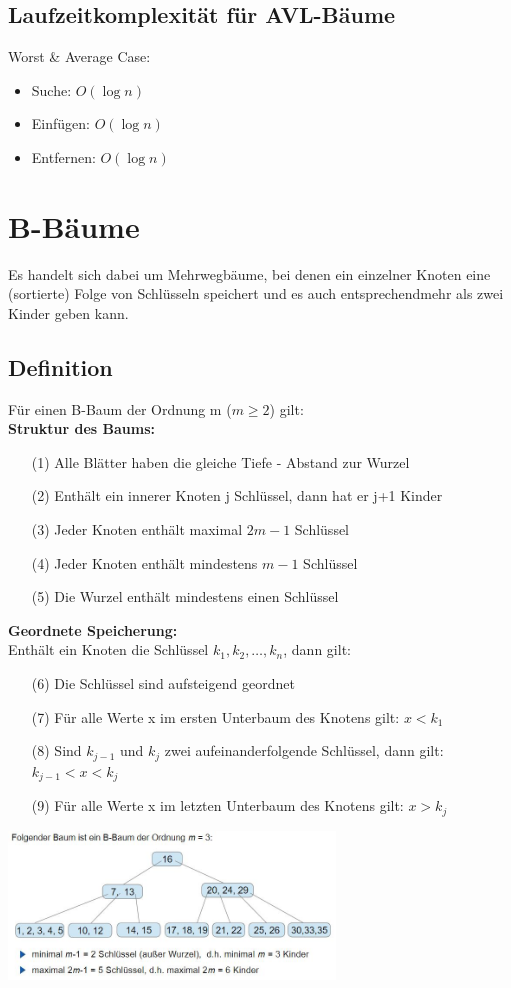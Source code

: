 \documentclass{scrreprt}
\begin{document}
\subsection{Laufzeitkomplexität für AVL-Bäume}
Worst \& Average Case:
\begin{itemize}
  \item Suche: $O(\log n)$
  \item Einfügen: $O(\log n)$
  \item Entfernen: $O(\log n)$
\end{itemize}
\section{B-Bäume}
Es handelt sich dabei um Mehrwegbäume, bei denen ein einzelner Knoten eine (sortierte) Folge von Schlüsseln
speichert und es auch entsprechendmehr als zwei Kinder geben kann.
\subsection{Definition}
Für einen B-Baum der Ordnung m ($m \geq 2$) gilt:
\\\textbf{Struktur des Baums:}
\begin{itemize}
  \item [(1)] Alle Blätter haben die gleiche Tiefe - Abstand zur Wurzel
  \item [(2)] Enthält ein innerer Knoten j Schlüssel, dann hat er j+1 Kinder
  \item [(3)] Jeder Knoten enthält maximal $2m-1$ Schlüssel
  \item [(4)] Jeder Knoten enthält mindestens $m-1$ Schlüssel
  \item [(5)] Die Wurzel enthält mindestens einen Schlüssel
\end{itemize}
\textbf{Geordnete Speicherung:}
\\ Enthält ein Knoten die Schlüssel $k_1, k_2, \dots, k_n$, dann gilt:
\begin{itemize}
  \item [(6)] Die Schlüssel sind aufsteigend geordnet
  \item [(7)] Für alle Werte x im ersten Unterbaum des Knotens gilt: $x < k_1$
  \item [(8)] Sind $k_{j-1}$ und $k_j$ zwei aufeinanderfolgende Schlüssel, dann gilt: $k_{j-1} < x < k_j$
  \item [(9)] Für alle Werte x im letzten Unterbaum des Knotens gilt: $x > k_j$
\end{itemize}
\includegraphics[width=0.65\textwidth]{graphics/B-Baum}
\end{document}

